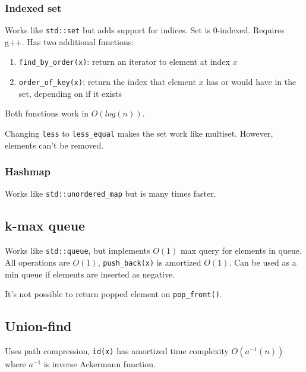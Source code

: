 \documentclass{article}
\begin{document}
\subsubsection {Indexed set}

Works like \texttt{std::set} but adds support for indices. Set is 0-indexed. Requires g++. Has two additional functions:

\begin{enumerate}
	\item \verb|find_by_order(x)|: return an iterator to element at index $x$
	\item \verb|order_of_key(x)|: return the index that element $x$ has or would have in the set, depending on if it exists
\end{enumerate}

Both functions work in $O(log(n))$.

Changing \texttt{less} to \verb|less_equal| makes the set work like multiset. However, elements can't be removed.



\subsubsection {Hashmap}

Works like \verb|std::unordered_map| but is many times faster.



\subsection {k-max queue}

Works like \texttt{std::queue}, but implements $O(1)$ max query for elements in queue. All operations are $O(1)$, \texttt{push\_back(x)} is amortized $O(1)$. Can be used as a min queue if elements are inserted as negative.

It's not possible to return popped element on \texttt{pop\_front()}.



\subsection{Union-find}

Uses path compression, \texttt{id(x)} has amortized time complexity $O(a^{-1}(n))$ where $a^{-1}$ is inverse Ackermann function.
\end{document}
